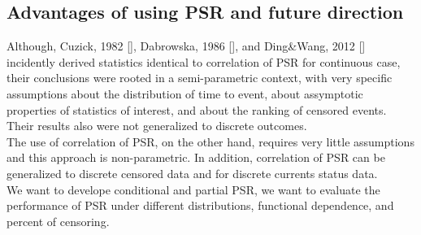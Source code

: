 \documentclass[]{article}
\begin{document}
\subsection{Advantages of using PSR and future direction}

Although, Cuzick, 1982 [\cite{cuzick1982rank}], Dabrowska, 1986 [\cite{dabrowska1988kaplan}], and Ding\&Wang, 2012 [\cite{ding2004testing}] incidently derived statistics identical to correlation of PSR for continuous case, their conclusions were rooted in a semi-parametric context, with very specific assumptions about the distribution of time to event, about assymptotic properties of statistics of interest, and about the ranking of censored events. Their results also were not generalized to discrete outcomes.\\

The use of correlation of PSR, on the other hand, requires very little assumptions and this approach is non-parametric. In addition, correlation of PSR can be generalized to discrete censored data and for discrete currents status data.\\

We want to develope conditional and partial PSR, we want to evaluate the performance of PSR under different distributions, functional dependence, and percent of censoring.
	

%
%
\end{document}
